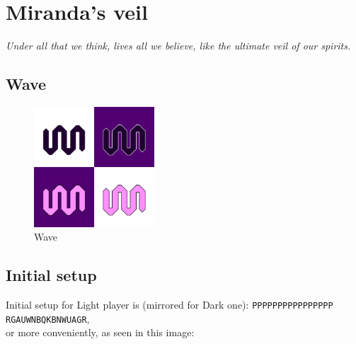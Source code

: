 \documentclass[a5paper,12pt,draft]{book} %
\begin{document}
\clearpage

\chapter*{Miranda's veil}

\begin{flushright}
\parbox{0.8\textwidth}{
\emph{Under all that we think, lives all we believe, like the ultimate veil of our spirits. \\
 } }
\end{flushright}

\section*{Wave}

\noindent
\begin{figure}
\includegraphics[width=0.4\textwidth, keepaspectratio=true]{../gfx/pieces/10_wave.png}
\caption{Wave}
\label{fig:wave}
\end{figure}

\clearpage

\section*{Initial setup}

Initial setup for Light player is (mirrored for Dark one):
\texttt{PPPPPPPPPPPPPPPP \\
        RGAUWNBQKBNWUAGR}, \\
or more conveniently, as seen in this image:
\end{document}
